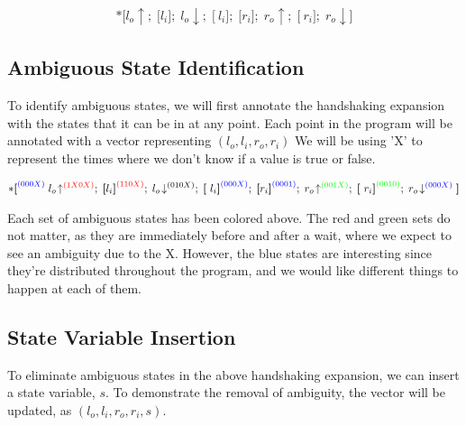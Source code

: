 \documentclass[times,10pt]{article}
\begin{document}
\begin{align*} 
*\textbf{[}l_o \! \uparrow; \; \textbf{[}l_i\textbf{]}; \; l_o\!\downarrow; \; \textbf{[}~l_i\textbf{]}; \; \textbf{[}r_i\textbf{]}; \; r_o \! \uparrow; \; \textbf{[}~r_i\textbf{]}; \; r_o \! \downarrow\textbf{]}
\end{align*}


\subsection{Ambiguous State Identification}

To identify ambiguous states, we will first annotate the handshaking expansion with the states that it can be in at any point.  Each point in the program will be annotated with a vector representing $(l_o, l_i, r_o, r_i)$ We will be using 'X' to represent the times where we don't know if a value is true or false.


\begin{align*} 
*\textbf{[} ^{\color{blue}(000X)} \;  l_o \! \uparrow^{\color{red}(1X0X)}; \; \textbf{[}l_i\textbf{]}^{\color{red}(110X)}; \; l_o\!\downarrow^{(010X)}; \; \textbf{[}~l_i\textbf{]}^{\color{blue}(000X)}; \; \textbf{[}r_i\textbf{]}^{\color{blue}(0001)}; \; r_o \! \uparrow^{\color{green}(001X)}; \; \textbf{[}~r_i\textbf{]}^{\color{green}(0010)}; \; r_o \! \downarrow^{\color{blue}(000X)}\textbf{]}
\end{align*}

Each set of ambiguous states has been colored above.  The red and green sets do not matter, as they are immediately before and after a wait, where we expect to see an ambiguity due to the X.  However, the blue states are interesting since they're distributed throughout the program, and we would like different things to happen at each of them. 


\subsection{State Variable Insertion}

To eliminate ambiguous states in the above handshaking expansion, we can insert a state variable, $s$.  To demonstrate the removal of ambiguity, the vector will be updated, as $(l_o, l_i, r_o, r_i, s)$.
\end{document}
